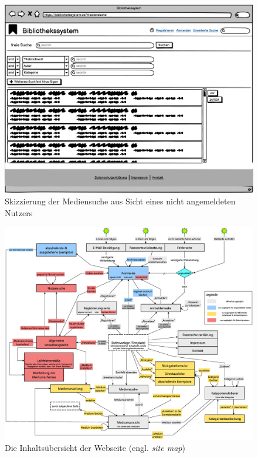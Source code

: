 \documentclass{article}
\begin{document}
\begin{figure}[h]
    \centering
    \includegraphics[width = 40em]{Mediensuche}
    \caption{Skizzierung der Mediensuche aus Sicht eines nicht angemeldeten Nutzers}
    \label{mediensuche}
\end{figure}

\newpage
{}

\begin{figure}[h]
    \centering
    \includegraphics[angle = 270, width = 60em]{site_map}
    \caption{Die Inhaltsübersicht der Webseite (engl. \textit{site map})}
    \label{site_map}
\end{figure}
\end{document}
